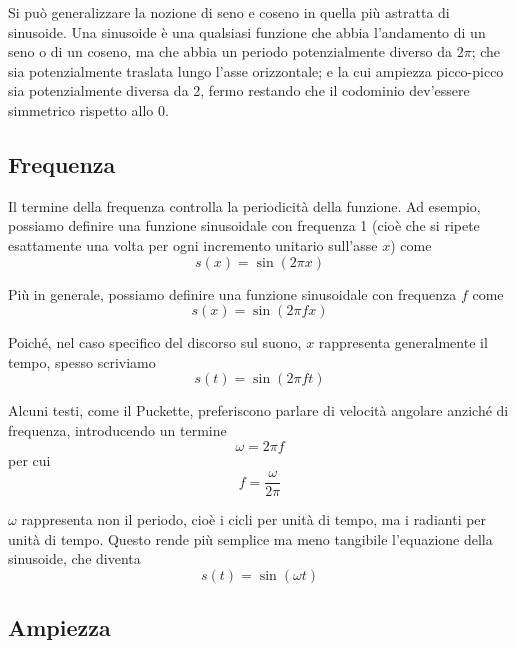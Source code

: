 \documentclass[11pt]{report}
\begin{document}
Si può generalizzare la nozione di seno e coseno in quella più astratta di sinusoide. Una sinusoide è una qualsiasi funzione che abbia l'andamento di un seno o di un coseno, ma che abbia un periodo potenzialmente diverso da $2 \pi$; che sia potenzialmente traslata lungo l'asse orizzontale; e la cui ampiezza picco-picco sia potenzialmente diversa da 2, fermo restando che il codominio dev'essere simmetrico rispetto allo 0.

\subsection{Frequenza}

Il termine della frequenza controlla la periodicità della funzione. Ad esempio, possiamo definire una funzione sinusoidale con frequenza 1 (cioè che si ripete esattamente una volta per ogni incremento unitario sull'asse $x$) come
\begin{equation}
s(x) = \sin(2 \pi x)
\end{equation}

Più in generale, possiamo definire una funzione sinusoidale con frequenza $f$ come
\begin{equation}
s(x) = \sin({2 \pi} f x)
\end{equation}

Poiché, nel caso specifico del discorso sul suono, $x$ rappresenta generalmente il tempo, spesso scriviamo
\begin{equation}
s(t) = \sin({2 \pi} f t)
\end{equation}

Alcuni testi, come il Puckette, preferiscono parlare di velocità angolare anziché di frequenza, introducendo un termine
\begin{equation}
\omega = 2 \pi f
\end{equation}
per cui
\begin{equation}
f = \frac{\omega}{2 \pi}
\end{equation}

$\omega$ rappresenta non il periodo, cioè i cicli per unità di tempo, ma i radianti per unità di tempo. Questo rende più semplice ma meno tangibile l'equazione della sinusoide, che diventa
\begin{equation}
s(t) = \sin(\omega t)
\end{equation}


\subsection{Ampiezza}
\end{document}

